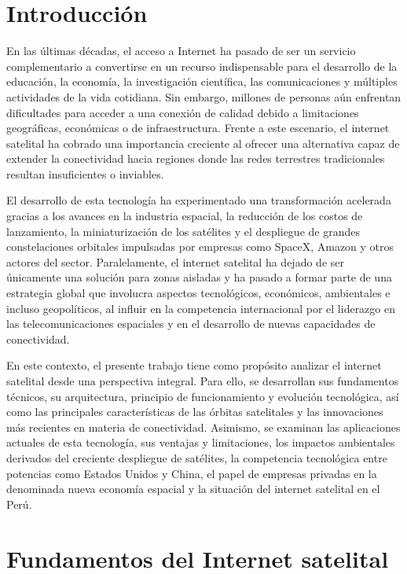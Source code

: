 \newpage
\section{Introducción}
En las últimas décadas, el acceso a Internet ha pasado de ser un servicio complementario a convertirse en un recurso indispensable para el desarrollo de la educación, la economía, la investigación científica, las comunicaciones y múltiples actividades de la vida cotidiana. Sin embargo, millones de personas aún enfrentan dificultades para acceder a una conexión de calidad debido a limitaciones geográficas, económicas o de infraestructura. Frente a este escenario, el internet satelital ha cobrado una importancia creciente al ofrecer una alternativa capaz de extender la conectividad hacia regiones donde las redes terrestres tradicionales resultan insuficientes o inviables.

El desarrollo de esta tecnología ha experimentado una transformación acelerada gracias a los avances en la industria espacial, la reducción de los costos de lanzamiento, la miniaturización de los satélites y el despliegue de grandes constelaciones orbitales impulsadas por empresas como SpaceX, Amazon y otros actores del sector. Paralelamente, el internet satelital ha dejado de ser únicamente una solución para zonas aisladas y ha pasado a formar parte de una estrategia global que involucra aspectos tecnológicos, económicos, ambientales e incluso geopolíticos, al influir en la competencia internacional por el liderazgo en las telecomunicaciones espaciales y en el desarrollo de nuevas capacidades de conectividad.

En este contexto, el presente trabajo tiene como propósito analizar el internet satelital desde una perspectiva integral. Para ello, se desarrollan sus fundamentos técnicos, su arquitectura, principio de funcionamiento y evolución tecnológica, así como las principales características de las órbitas satelitales y las innovaciones más recientes en materia de conectividad. Asimismo, se examinan las aplicaciones actuales de esta tecnología, sus ventajas y limitaciones, los impactos ambientales derivados del creciente despliegue de satélites, la competencia tecnológica entre potencias como Estados Unidos y China, el papel de empresas privadas en la denominada nueva economía espacial y la situación del internet satelital en el Perú.
\section{Fundamentos del Internet satelital}
